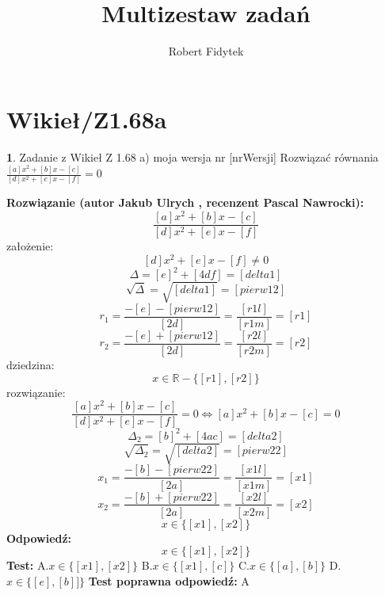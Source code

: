 \documentclass[12pt, a4paper]{article}
\title{Multizestaw zadań}
\author{Robert Fidytek}
\date{}
\theoremstyle{definition} %
\newtheorem{zad}{}
\newcommand{\kategoria}[1]{\section{#1}} %
\newcommand{\zadStart}[1]{\begin{zad}#1\newline} %
\newcommand{\zadStop}{\end{zad}}   %
\newcommand{\rozwStart}[2]{\noindent \textbf{Rozwiązanie (autor #1 , recenzent #2): }\newline} %
\newcommand{\rozwStop}{\newline}                                            %
\newcommand{\odpStart}{\noindent \textbf{Odpowiedź:}\newline}    %
\newcommand{\odpStop}{\newline}                                             %
\newcommand{\testStart}{\noindent \textbf{Test:}\newline} %
\newcommand{\testStop}{\newline} %
\newcommand{\kluczStart}{\noindent \textbf{Test poprawna odpowiedź:}\newline} %
\newcommand{\kluczStop}{\newline} %
\begin{document}
\maketitle


\kategoria{Wikieł/Z1.68a}
\zadStart{Zadanie z Wikieł Z 1.68 a) moja wersja nr [nrWersji]}
Rozwiązać równania $\frac{[a]x^{2}+[b]x-[c]}{[d]x^{2}+[e]x-[f]}=0$
\zadStop
\rozwStart{Jakub Ulrych}{Pascal Nawrocki}
$$\frac{[a]x^{2}+[b]x-[c]}{[d]x^{2}+[e]x-[f]}$$
założenie:$$[d]x^{2}+[e]x-[f]\neq0$$
$$\Delta=[e]^{2}+[4df]=[delta1]$$
$$\sqrt{\Delta}=\sqrt{[delta1]}=[pierw12]$$
$$r_{1}=\frac{-[e]-[pierw12]}{[2d]}=\frac{[r1l]}{[r1m]}=[r1]$$
$$r_{2}=\frac{-[e]+[pierw12]}{[2d]}=\frac{[r2l]}{[r2m]}=[r2]$$
dziedzina:$$x\in\mathbb{R}-\{[r1],[r2]\}$$
rozwiązanie:$$\frac{[a]x^{2}+[b]x-[c]}{[d]x^{2}+[e]x-[f]}=0\Leftrightarrow[a]x^{2}+[b]x-[c]=0$$
$$\Delta_{2}=[b]^{2}+[4ac]=[delta2]$$
$$\sqrt{\Delta_{2}}=\sqrt{[delta2]}=[pierw22]$$
$$x_{1}=\frac{-[b]-[pierw22]}{[2a]}=\frac{[x1l]}{[x1m]}=[x1]$$
$$x_{2}=\frac{-[b]+[pierw22]}{[2a]}=\frac{[x2l]}{[x2m]}=[x2]$$
$$x\in\{[x1],[x2]\}$$
\rozwStop
\odpStart
$$x\in\{[x1],[x2]\}$$
\odpStop
\testStart
A.$x\in\{[x1],[x2]\}$
B.$x\in\{[x1],[c]\}$
C.$x\in\{[a],[b]\}$
D.$x\in\{[e],[b]]\}$
\testStop
\kluczStart
A
\kluczStop
\end{document}
